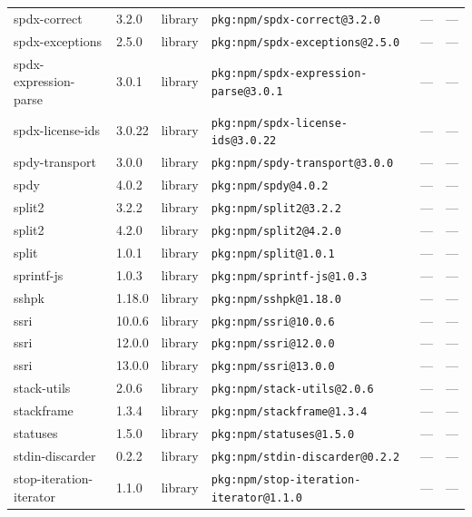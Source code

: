 \documentclass[11pt,a4paper]{article}
\begin{document}
\begin{longtable}{|p{4cm}|p{2cm}|p{1.6cm}|p{5cm}|p{1.5cm}|p{3.5cm}|}
\raggedright spdx-correct & 3.2.0 & library & \small\texttt{pkg:npm/spdx-correct@3.2.0} & — & \small — \\
\raggedright spdx-exceptions & 2.5.0 & library & \small\texttt{pkg:npm/spdx-exceptions@2.5.0} & — & \small — \\
\raggedright spdx-expression-parse & 3.0.1 & library & \small\texttt{pkg:npm/spdx-expression-parse@3.0.1} & — & \small — \\
\raggedright spdx-license-ids & 3.0.22 & library & \small\texttt{pkg:npm/spdx-license-ids@3.0.22} & — & \small — \\
\raggedright spdy-transport & 3.0.0 & library & \small\texttt{pkg:npm/spdy-transport@3.0.0} & — & \small — \\
\raggedright spdy & 4.0.2 & library & \small\texttt{pkg:npm/spdy@4.0.2} & — & \small — \\
\raggedright split2 & 3.2.2 & library & \small\texttt{pkg:npm/split2@3.2.2} & — & \small — \\
\raggedright split2 & 4.2.0 & library & \small\texttt{pkg:npm/split2@4.2.0} & — & \small — \\
\raggedright split & 1.0.1 & library & \small\texttt{pkg:npm/split@1.0.1} & — & \small — \\
\raggedright sprintf-js & 1.0.3 & library & \small\texttt{pkg:npm/sprintf-js@1.0.3} & — & \small — \\
\raggedright sshpk & 1.18.0 & library & \small\texttt{pkg:npm/sshpk@1.18.0} & — & \small — \\
\raggedright ssri & 10.0.6 & library & \small\texttt{pkg:npm/ssri@10.0.6} & — & \small — \\
\raggedright ssri & 12.0.0 & library & \small\texttt{pkg:npm/ssri@12.0.0} & — & \small — \\
\raggedright ssri & 13.0.0 & library & \small\texttt{pkg:npm/ssri@13.0.0} & — & \small — \\
\raggedright stack-utils & 2.0.6 & library & \small\texttt{pkg:npm/stack-utils@2.0.6} & — & \small — \\
\raggedright stackframe & 1.3.4 & library & \small\texttt{pkg:npm/stackframe@1.3.4} & — & \small — \\
\raggedright statuses & 1.5.0 & library & \small\texttt{pkg:npm/statuses@1.5.0} & — & \small — \\
\raggedright stdin-discarder & 0.2.2 & library & \small\texttt{pkg:npm/stdin-discarder@0.2.2} & — & \small — \\
\raggedright stop-iteration-iterator & 1.1.0 & library & \small\texttt{pkg:npm/stop-iteration-iterator@1.1.0} & — & \small — \\

\end{longtable}
\end{document}
